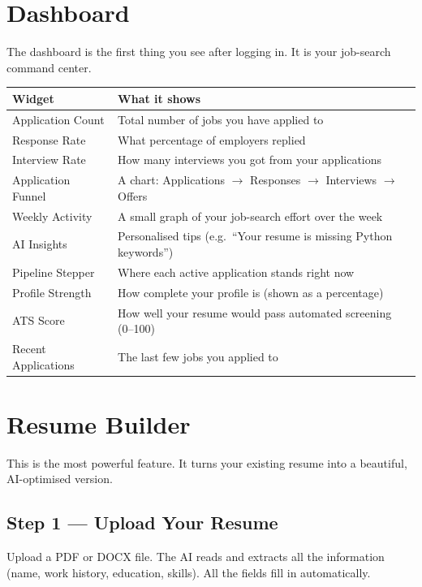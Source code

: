 \documentclass[12pt, a4paper]{report}
\begin{document}
\section{Dashboard}

The dashboard is the first thing you see after logging in.
It is your job-search command center.

\begin{center}
\begin{tabularx}{\textwidth}{lX}
\toprule
\textbf{Widget} & \textbf{What it shows} \\
\midrule
Application Count    & Total number of jobs you have applied to \\
Response Rate        & What percentage of employers replied \\
Interview Rate       & How many interviews you got from your applications \\
Application Funnel   & A chart: Applications $\to$ Responses $\to$ Interviews $\to$ Offers \\
Weekly Activity      & A small graph of your job-search effort over the week \\
AI Insights          & Personalised tips (e.g.\ ``Your resume is missing Python keywords'') \\
Pipeline Stepper     & Where each active application stands right now \\
Profile Strength     & How complete your profile is (shown as a percentage) \\
ATS Score            & How well your resume would pass automated screening (0--100) \\
Recent Applications  & The last few jobs you applied to \\
\bottomrule
\end{tabularx}
\end{center}

\section{Resume Builder}

This is the most powerful feature.  It turns your existing resume into a beautiful,
AI-optimised version.

\subsection{Step 1 --- Upload Your Resume}

Upload a PDF or DOCX file.  The AI reads and extracts all the information
(name, work history, education, skills).  All the fields fill in automatically.
\end{document}

